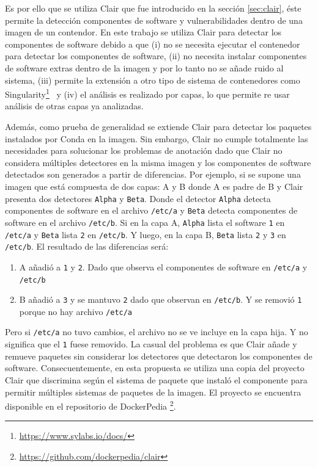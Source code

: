 Es por ello que se utiliza Clair que fue introducido en la sección  \ref{sec:clair}, éste permite la detección componentes de software y vulnerabilidades dentro de una imagen de un contendor.
En este trabajo se utiliza Clair para detectar los componentes de software debido a que (i) no se necesita ejecutar el contenedor para detectar los componentes de software, (ii) no necesita instalar componentes de software extras dentro de la imagen y por lo tanto no se añade ruido al sistema, (iii) permite la extensión a otro tipo de sistema de contenedores como Singularity\footnote{\url{https://www.sylabs.io/docs/}}~\cite{kurtzer2017singularity} y (iv) el análisis es realizado por capas, lo que permite re usar análisis de otras capas ya analizadas.

Además, como prueba de generalidad se extiende Clair para detectar los paquetes instalados por Conda en la imagen.  
Sin embargo, Clair no cumple totalmente las necesidades para solucionar los problemas de anotación dado que Clair no considera múltiples detectores en la misma imagen y los componentes de software detectados son generados a partir de diferencias.
Por ejemplo, si se supone una imagen que está compuesta de dos capas: A y B donde A es padre de B y Clair presenta dos detectores \texttt{Alpha} y \texttt{Beta}. Donde el detector \texttt{Alpha} detecta componentes de software en el archivo \verb|/etc/a| y  \texttt{Beta} detecta componentes de software en el archivo \verb|/etc/b|. Si en la capa A, \texttt{Alpha} lista el software \verb|1| en \verb|/etc/a| y \texttt{Beta} lista \verb|2| en  \verb|/etc/b|. Y luego, en la capa B, \texttt{Beta}  lista \verb|2| y \verb|3| en  \verb|/etc/b|. El resultado de las diferencias será: 

\begin{enumerate}
	\item A añadió a \verb|1| y \verb|2|. Dado que observa el componentes de software en \verb|/etc/a| y \verb|/etc/b|
	\item  B añadió a \verb|3| y se mantuvo \verb|2| dado que observan en \verb|/etc/b|. Y se removió \verb|1| porque no hay archivo \verb|/etc/a|
\end{enumerate}

Pero si \verb|/etc/a| no tuvo cambios, el archivo no se ve incluye en la capa hija. Y no significa que el \verb|1| fuese removido. 
La casual del problema es que Clair añade y remueve paquetes sin considerar los detectores que detectaron los componentes de software. 
Consecuentemente, en esta propuesta se utiliza una copia del proyecto Clair que discrimina según el sistema de paquete que instaló el componente para permitir múltiples sistemas de paquetes de la imagen. El proyecto se encuentra disponible en el repositorio de DockerPedia \footnote{\url{https://github.com/dockerpedia/clair}}.

